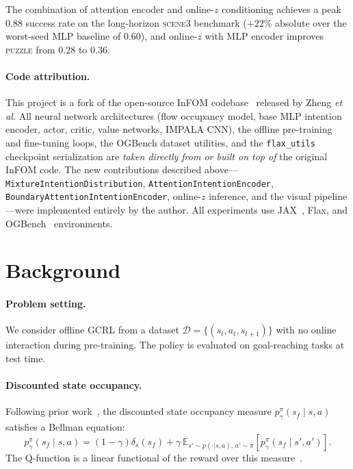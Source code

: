 \documentclass{article}
\newcommand{\etal}{\textit{et al.}}
\newcommand{\base}{InFOM}
\begin{document}
The combination of attention encoder and online-$z$ conditioning achieves
a peak $0.88$ success rate on the long-horizon \textsc{scene3} benchmark
($+22\%$ absolute over the worst-seed MLP baseline of $0.60$),
and online-$z$ with MLP encoder improves \textsc{puzzle} from $0.28$ to $0.36$.

\paragraph{Code attribution.}
This project is a fork of the open-source \base{}
codebase~\cite{zheng2025infom} released by Zheng \etal{}
All neural network architectures (flow occupancy model, base MLP intention
encoder, actor, critic, value networks, IMPALA CNN),
the offline pre-training and fine-tuning loops,
the OGBench dataset utilities, and the \texttt{flax\_utils} checkpoint
serialization are \emph{taken directly from or built on top of} the
original \base{} code.
The new contributions described above---\texttt{Mixture\-Intention\-Distribution},
\texttt{Attention\-Intention\-Encoder},
\texttt{Boundary\-Attention\-Intention\-Encoder},
online-$z$ inference, and the visual pipeline---were
implemented entirely by the author.
All experiments use JAX~\cite{bradbury2018jax}, Flax,
and OGBench~\cite{park2025ogbench} environments.

\section{Background}
\label{sec:background}

\paragraph{Problem setting.}
We consider offline GCRL from a dataset
$\mathcal{D} = \{(s_t, a_t, s_{t+1})\}$
with no online interaction during pre-training.
The policy is evaluated on goal-reaching tasks at test time.

\paragraph{Discounted state occupancy.}
Following prior work~\cite{dayan1993successor,janner2020gamma,
touati2021fb,eysenbach2022contrastive,zheng2024cdpc},
the discounted state occupancy measure
$p^\pi_\gamma(s_f \mid s,a)$ satisfies a Bellman
equation:
\begin{equation}
  p^\pi_\gamma(s_f \!\mid\! s,\!a)
  = (1\!-\!\gamma)\delta_s(s_f)
  + \gamma \,\mathbb{E}_{s'\sim p(\cdot|s,a),\,a'\sim\pi}
    [p^\pi_\gamma(s_f \!\mid\! s'\!,\!a')].
\end{equation}
The Q-function is a linear functional of the reward over this
measure~\cite{barreto2017sf,touati2021fb}.
\end{document}
